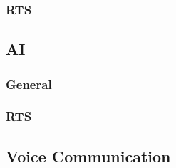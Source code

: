 \subsubsection{RTS}

\subsection{AI}

\subsubsection{General}

\subsubsection{RTS}

\subsection{Voice Communication}